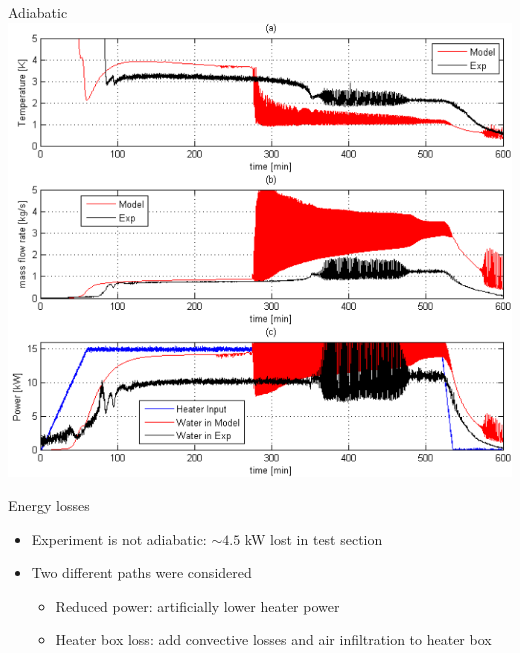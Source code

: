 \documentclass[10pt,t,xcolor=table]{UWMadBeamer}
\begin{document}
\begin{frame}{Adiabatic}
    \centering
    \includegraphics[height=0.77\paperheight]{Comparison_Adiabatic}
\end{frame}
\begin{frame}{Energy losses}
    \begin{itemize}
        \item Experiment is not adiabatic: $\sim4.5$ kW lost in test section
        \item Two different paths were considered
        \begin{itemize}
            \item Reduced power: artificially lower heater power
            \item Heater box loss: add convective losses and air infiltration to heater box
        \end{itemize}
    \end{itemize}
\end{frame}
\end{document}
